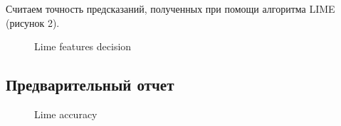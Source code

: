\documentclass[12pt]{article}
\begin{document}
Считаем точность предсказаний, полученных при помощи алгоритма LIME \cite{ribeiro2016why} (рисунок 2). 

\begin{figure}
 \caption{Lime features decision}
  \label{fig:1}
\end{figure}

\subsection{Предварительный отчет}

\begin{figure}
\caption{Lime accuracy}
\label{fig:image}
\end{figure}
\end{document}
